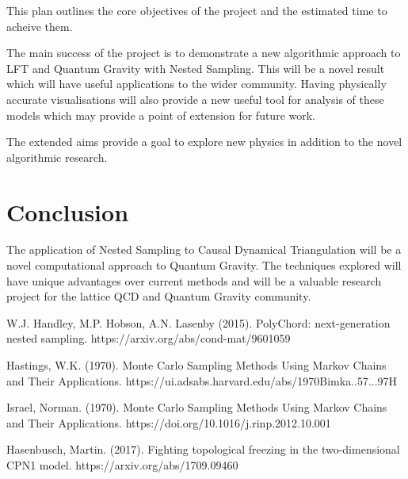 \documentclass[a4paper]{article}
\begin{document}
This plan outlines the core objectives of the project and the
estimated time to acheive them.

The main success of the project is to
demonstrate a new algorithmic approach to LFT and Quantum Gravity with Nested
Sampling. This will be a novel result which will have useful
applications to the wider community. Having physically accurate
visualisations will also provide a new useful tool for analysis of
these models which may provide a point of extension for future work. 

The extended aims provide a goal to explore new physics in addition
to the novel algorithmic research.

    
\section{Conclusion}
The application of Nested Sampling to Causal Dynamical Triangulation will be a novel computational approach to Quantum Gravity. The techniques explored will have unique advantages over current methods and will be a valuable research project for the lattice QCD and Quantum Gravity community.


\newpage
\begin{thebibliography}{9}
W.J. Handley, M.P. Hobson, A.N. Lasenby (2015). PolyChord: next-generation nested sampling. https://arxiv.org/abs/cond-mat/9601059

Hastings, W.K. (1970). Monte Carlo Sampling Methods Using Markov Chains and Their Applications. https://ui.adsabs.harvard.edu/abs/1970Bimka..57...97H

Israel, Norman. (1970). Monte Carlo Sampling Methods Using Markov
Chains and Their
Applications. https://doi.org/10.1016/j.rinp.2012.10.001

Hasenbusch, Martin. (2017). Fighting topological freezing in the two-dimensional CPN1 model. https://arxiv.org/abs/1709.09460
\end{thebibliography}
\end{document}
